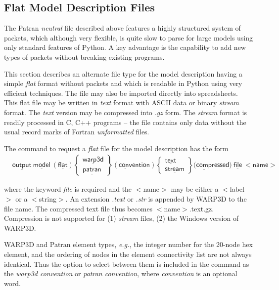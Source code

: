 \documentclass[11pt]{report}
\numberwithin{equation}{section}
\newcommand{\nin} {\noindent}
\newcommand{\ul} {\underline}
\newcommand{\hv} {\mathsf}   %
\newcommand{\eg}{\emph{e.g.},\xspace}
\newcommand{\ti}{\emph}
\begin{document}
\subsection{Flat Model Description Files}
\nin The Patran \ti{neutral} file described above features a highly structured system of
packets, which although very flexible, is quite slow to parse for large models using
only standard features of Python.  A key advantage is the capability to add new types of packets without
breaking existing programs.

This section describes an alternate file type for the model description
having a simple \ti{flat} format without packets and which is readable in Python using
very efficient techniques. The file may also be imported directly into 
spreadsheets. This flat file may be written in \ti{text} format with ASCII data or
binary \ti{stream} format. The \ti{text} version may be compressed into \ti{.gz} form.
The \ti{stream} format is readily processed in C, C++ programs -- the file contains only data
without the usual record marks of Fortran \ti{unformatted} files.

The command to request a \ti{flat} file for the model description  
has the form
\begin{align*}
& \hv{\ul{output}\ \ul{model}\ (\ul{flat})   }
\begin{Bmatrix}
\hv{\ul{warp3d}} \\ \hv{\ul{patran}} 
\end{Bmatrix} 
(\hv{\ul{conv}ention})
\begin{Bmatrix}
\hv{\ul{text}} \\ \hv{\ul{stream}} 
\end{Bmatrix} 
(\hv{\ul{comp}ressed)\ \ul{file}\ <name>}
\end{align*}

\nin
where the keyword \ti{file} is required and the    $<$name$>$ may be either
a $<$label$>$ or a $<$string$>$. An extension \ti{.text} or \ti{.str} is appended by WARP3D
to the file name. The compressed text file thus becomes $<$name$>$.text.gz. Compression 
is not supported for (1) \ti{stream} files, (2) the Windows version of WARP3D. 

WARP3D and Patran element types, \eg the integer number for the 20-node hex element,
and the ordering of nodes in the element 
connectivity list are not always identical. Thus the option to select between them
is included in the command as the \ti{warp3d convention} or \ti{patran convention},
where \ti{convention} is an optional word.
\end{document}
